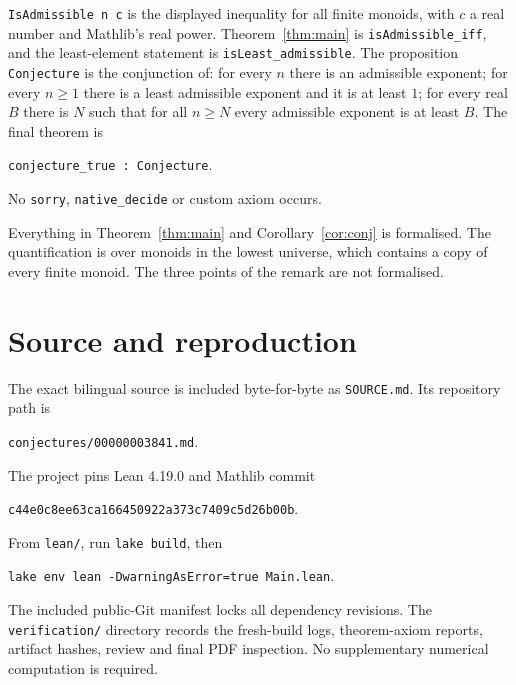 \documentclass[11pt]{article}
\theoremstyle{remark}
\begin{document}
\texttt{IsAdmissible n c} is the displayed inequality for all finite
monoids, with $c$ a real number and Mathlib's real power.
Theorem~\ref{thm:main} is \texttt{isAdmissible\_iff}, and the
least-element statement is \texttt{isLeast\_admissible}. The proposition
\texttt{Conjecture} is the conjunction of: for every $n$ there is an
admissible exponent; for every $n\ge1$ there is a least admissible
exponent and it is at least $1$; for every real $B$ there is $N$ such
that for all $n\ge N$ every admissible exponent is at least $B$. The
final theorem is
\begin{center}\small\texttt{conjecture\_true : Conjecture}.\end{center}
No \texttt{sorry}, \texttt{native\_decide} or custom axiom occurs.

Everything in Theorem~\ref{thm:main} and Corollary~\ref{cor:conj} is
formalised. The quantification is over monoids in the lowest universe,
which contains a copy of every finite monoid. The three points of the
remark are not formalised.

\section*{Source and reproduction}
The exact bilingual source is included byte-for-byte as
\texttt{SOURCE.md}. Its repository path is
\begin{center}\small\texttt{conjectures/00000003841.md}.\end{center}
The project pins Lean 4.19.0 and Mathlib commit
\begin{center}\small\texttt{c44e0c8ee63ca166450922a373c7409c5d26b00b}.\end{center}
From \texttt{lean/}, run \texttt{lake build}, then
\begin{center}\small\texttt{lake env lean -DwarningAsError=true Main.lean}.\end{center}
The included public-Git manifest locks all dependency revisions. The
\texttt{verification/} directory records the fresh-build logs,
theorem-axiom reports, artifact hashes, review and final PDF
inspection. No supplementary numerical computation is required.
\end{document}
